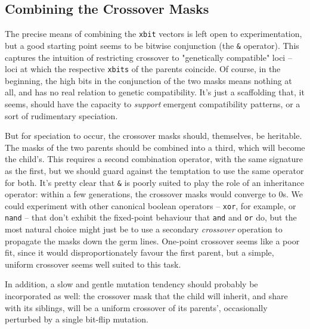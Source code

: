 \documentclass[11pt]{article}
\begin{document}
\subsection{Combining the Crossover Masks}
\label{sec:org41664c2}
\label{org462099b}

The precise means of combining the \texttt{xbit} vectors is left open to
experimentation, but a good starting point seems to be bitwise conjunction (the
\texttt{\&} operator). This captures the intuition of restricting crossover to
"genetically compatible" loci -- loci at which the respective \texttt{xbits} of the
parents coincide. Of course, in the beginning, the high bits in the conjunction
of the two masks means nothing at all, and has no real relation to genetic
compatibility. It's just a scaffolding that, it seems, should have the capacity
to \emph{support} emergent compatibility patterns, or a sort of rudimentary
speciation.

But for speciation to occur, the crossover masks should, themselves, be
heritable. The masks of the two parents should be combined into a third,
which will become the child's. This requires a second combination operator,
with the same signature as the first, but we should guard against the
temptation to use the same operator for both. It's pretty clear that \texttt{\&}
is poorly suited to play the role of an inheritance operator: within a
few generations, the crossover masks would converge to 0s. We could
experiment with other canonical boolean operators -- \texttt{xor}, for example,
or \texttt{nand} -- that don't exhibit the fixed-point behaviour that \texttt{and} and
\texttt{or} do, but the most natural choice might just be to use a secondary
\emph{crossover} operation to propagate the masks down the germ lines.
One-point crossover seems like a poor fit, since it would disproportionately
favour the first parent, but a simple, uniform crossover seems well
suited to this task.

In addition, a slow and gentle mutation tendency should probably be 
incorporated as well: the crossover mask that the child will inherit,
and share with its siblings, will be a uniform crossover of its
parents', occasionally perturbed by a single bit-flip mutation.
\end{document}
